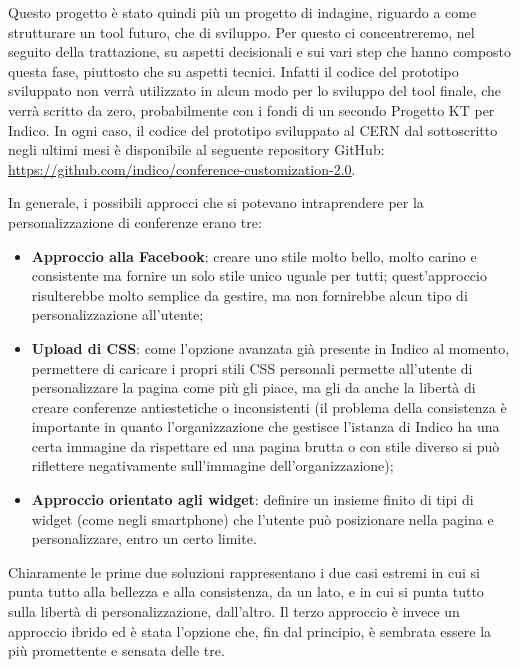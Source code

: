             Questo progetto è stato quindi più un progetto di indagine, riguardo a come strutturare un tool futuro, che di sviluppo. Per questo ci concentreremo, nel seguito della trattazione, su aspetti decisionali e sui vari step che hanno composto questa fase, piuttosto che su aspetti tecnici. Infatti il codice del prototipo sviluppato non verrà utilizzato in alcun modo per lo sviluppo del tool finale, che verrà scritto da zero, probabilmente con i fondi di un secondo Progetto KT per Indico. In ogni caso, il codice del prototipo sviluppato al \ac{CERN} dal sottoscritto negli ultimi mesi è disponibile al seguente repository GitHub: \url{https://github.com/indico/conference-customization-2.0}.
            
            In generale, i possibili approcci che si potevano intraprendere per la personalizzazione di conferenze erano tre:
            
            \begin{itemize}
                \item \textbf{Approccio alla Facebook}: creare uno stile molto bello, molto carino e consistente ma fornire un solo stile unico uguale per tutti; quest'approccio risulterebbe molto semplice da gestire, ma non fornirebbe alcun tipo di personalizzazione all'utente;
                \item \textbf{Upload di \ac{CSS}}: come l'opzione avanzata già presente in Indico al momento, permettere di caricare i propri stili \ac{CSS} personali permette all'utente di personalizzare la pagina come più gli piace, ma gli da anche la libertà di creare conferenze antiestetiche o inconsistenti (il problema della consistenza è importante in quanto l'organizzazione che gestisce l'istanza di Indico ha una certa immagine da rispettare ed una pagina brutta o con stile diverso si può riflettere negativamente sull'immagine dell'organizzazione);
                \item \textbf{Approccio orientato agli widget}: definire un insieme finito di tipi di widget (come negli smartphone) che l'utente può posizionare nella pagina e personalizzare, entro un certo limite.
            \end{itemize}
            
            Chiaramente le prime due soluzioni rappresentano i due casi estremi in cui si punta tutto alla bellezza e alla consistenza, da un lato, e in cui si punta tutto sulla libertà di personalizzazione, dall'altro. Il terzo approccio è invece un approccio ibrido ed è stata l'opzione che, fin dal principio, è sembrata essere la più promettente e sensata delle tre.
            
